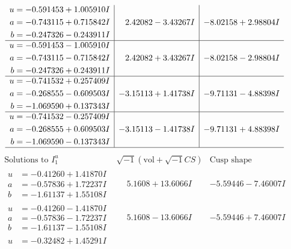 \documentclass[1p]{elsarticle_modified}
\theoremstyle{definition}
\newcommand{\I}{\sqrt{-1}}
\begin{document}
$$\begin{array}{c|c|c}
\begin{aligned}
u &= -0.591453 + 1.005910 I \\
a &= -0.743115 + 0.715842 I \\
b &= -0.247326 - 0.243911 I\end{aligned}
 & \phantom{-}2.42082 - 3.43267 I & -8.02158 + 2.98804 I \\ \hline\begin{aligned}
u &= -0.591453 - 1.005910 I \\
a &= -0.743115 - 0.715842 I \\
b &= -0.247326 + 0.243911 I\end{aligned}
 & \phantom{-}2.42082 + 3.43267 I & -8.02158 - 2.98804 I \\ \hline\begin{aligned}
u &= -0.741532 + 0.257409 I \\
a &= -0.268555 - 0.609503 I \\
b &= -1.069590 + 0.137343 I\end{aligned}
 & -3.15113 + 1.41738 I & -9.71131 - 4.88398 I \\ \hline\begin{aligned}
u &= -0.741532 - 0.257409 I \\
a &= -0.268555 + 0.609503 I \\
b &= -1.069590 - 0.137343 I\end{aligned}
 & -3.15113 - 1.41738 I & -9.71131 + 4.88398 I\\
 \hline 
 \end{array}$$\newpage$$\begin{array}{c|c|c}  
\text{Solutions to }I^u_{1}& \I (\text{vol} + \sqrt{-1}CS) & \text{Cusp shape}\\
 \hline 
\begin{aligned}
u &= -0.41260 + 1.41870 I \\
a &= -0.57836 + 1.72237 I \\
b &= -1.61137 + 1.55108 I\end{aligned}
 & \phantom{-}5.1608 + 13.6066 I & -5.59446 - 7.46007 I \\ \hline\begin{aligned}
u &= -0.41260 - 1.41870 I \\
a &= -0.57836 - 1.72237 I \\
b &= -1.61137 - 1.55108 I\end{aligned}
 & \phantom{-}5.1608 - 13.6066 I & -5.59446 + 7.46007 I \\ \hline\begin{aligned}
u &= -0.32482 + 1.45291 I \\

\end{aligned}
\end{array}$$
\end{document}
